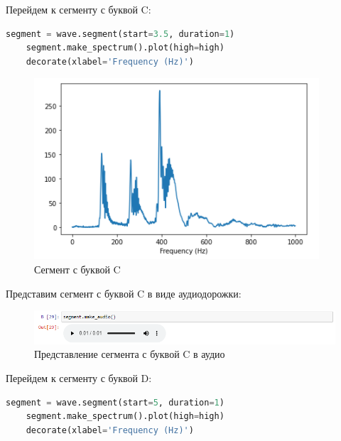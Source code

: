 \documentclass[a4paper]{article}
\begin{document}
             Перейдем к сегменту с буквой C:
            
\begin{lstlisting}[language=Python, caption= Сегмент с буквой C]
    segment = wave.segment(start=3.5, duration=1)
    segment.make_spectrum().plot(high=high)
    decorate(xlabel='Frequency (Hz)')
\end{lstlisting}   
            
             \begin{figure}[H]
                \centering
                \includegraphics{ex_6_letter_c_segment.png}
                \caption{Сегмент с буквой C}
                \label{fig:ex_6_letter_c_segment}
            \end{figure}
            
            Представим сегмент с буквой C в виде аудиодорожки:
            
            \begin{figure}[H]
                \centering
                \includegraphics[width=\textwidth]{ex_6_letter_c_audio.png}
                \caption{Представление сегмента с буквой C в аудио}
                \label{fig:ex_6_letter_c_audio}
            \end{figure}
            
             Перейдем к сегменту с буквой D:
            
\begin{lstlisting}[language=Python, caption= Сегмент с буквой D]
    segment = wave.segment(start=5, duration=1)
    segment.make_spectrum().plot(high=high)
    decorate(xlabel='Frequency (Hz)')
\end{lstlisting}   
            
\end{document}
